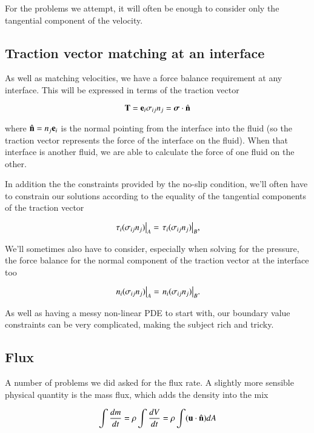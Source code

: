 For the problems we attempt, it will often be enough to consider only the tangential component of the velocity.

\subsection{Traction vector matching at an interface}

As well as matching velocities, we have a force balance requirement at any interface.  This will be expressed in terms of the traction vector

\begin{equation}\label{eqn:continuumFluidsReview:1210}
\mathbf{T} = \mathbf{e}_i \sigma_{ij} n_j = \boldsymbol{\sigma} \cdot \hat{\mathbf{n}}
\end{equation}

where $\hat{\mathbf{n}} = n_j \mathbf{e}_i$ is the normal pointing from the interface into the fluid (so the traction vector represents the force of the interface on the fluid).  When that interface is another fluid, we are able to calculate the force of one fluid on the other.

In addition the the constraints provided by the no-slip condition, we'll often have to constrain our solutions according to the equality of the tangential components of the traction vector

\begin{equation}\label{eqn:continuumFluidsReview:1230}
{\left.{\tau_i (\sigma_{ij} n_j)}\right\vert}_{A} =
{\left.{\tau_i (\sigma_{ij} n_j)}\right\vert}_{B},
\end{equation}

We'll sometimes also have to consider, especially when solving for the pressure, the force balance for the normal component of the traction vector at the interface too

\begin{equation}\label{eqn:continuumFluidsReview:1250}
{\left.{n_i (\sigma_{ij} n_j)}\right\vert}_{A} =
{\left.{n_i (\sigma_{ij} n_j)}\right\vert}_{B}.
\end{equation}

As well as having a messy non-linear PDE to start with, our boundary value constraints can be very complicated, making the subject rich and tricky.

\subsection{Flux}

A number of problems we did asked for the flux rate.  A slightly more sensible physical quantity is the mass flux, which adds the density into the mix

\begin{equation}\label{eqn:continuumFluidsReview:1450}
\int \frac{dm}{dt} = \rho \int \frac{dV}{dt} = \rho \int (\mathbf{u} \cdot \hat{\mathbf{n}}) dA
\end{equation}

